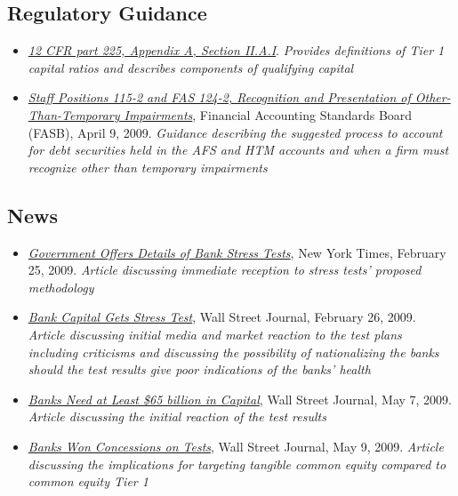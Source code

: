 \documentclass[justified, nobib]{tufte-handout2}
\begin{document}
\subsection{Regulatory Guidance}

\begin{itemize}
\item
  \href{https://www.law.cornell.edu/cfr/text/12/part-225/appendix-A}{\emph{12
  CFR part 225, Appendix A, Section II.A.I}}. \emph{Provides definitions
  of Tier 1 capital ratios and describes components of qualifying
  capital}
\item
  \href{http://www.gasb.org/jsp/FASB/Document_C/DocumentPage\%3Fcid=1176154545419\%26acceptedDisclaimer=true}{\emph{Staff
  Positions 115-2 and FAS 124-2, Recognition and Presentation of
  Other-Than-Temporary Impairments}}, Financial Accounting Standards
  Board (FASB), April 9, 2009. \emph{Guidance describing the suggested
  process to account for debt securities held in the AFS and HTM
  accounts and when a firm must recognize other than temporary
  impairments }
\end{itemize}

\subsection{News}

\begin{itemize}
\item
  \href{http://www.nytimes.com/2009/02/26/business/economy/26banks.html}{\emph{Government
  Offers Details of Bank Stress Tests}}, New York Times, February 25,
  2009. \emph{Article discussing immediate reception to stress tests'
  proposed methodology}
\item
  \href{http://www.wsj.com/articles/SB123557705225772665}{\emph{Bank
  Capital Gets Stress Test}}, Wall Street Journal, February 26, 2009.
  \emph{Article discussing initial media and market reaction to the test
  plans including criticisms and discussing the possibility of
  nationalizing the banks should the test results give poor indications
  of the banks' health}
\item
  \href{http://www.wsj.com/articles/SB124163049445592523}{\emph{Banks
  Need at Least \$65 billion in Capital}}, Wall Street Journal, May 7,
  2009. \emph{Article discussing the initial reaction of the test
  results}
\item
  \href{http://www.wsj.com/articles/SB124182311010302297}{\emph{Banks
  Won Concessions on Tests}}, Wall Street Journal, May 9, 2009.
  \emph{Article discussing the implications for targeting tangible
  common equity compared to common equity Tier 1}
\end{itemize}
\end{document}
